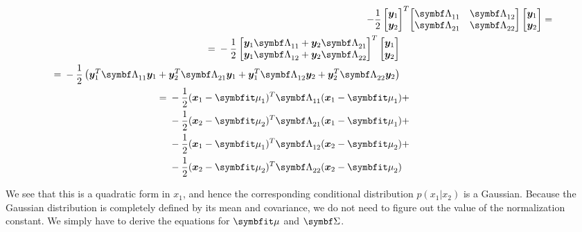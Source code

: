 \begin{align}
    -\frac{1}{2} \begin{bmatrix} \vy_1 \\ \vy_2 \end{bmatrix} ^T & \partlambda \begin{bmatrix} \vy_1 \\ \vy_2 \end{bmatrix} = \\
  \begin{split}
    ={}& -\frac{1}{2} \begin{bmatrix} \vy_1 \ml{11} + \vy_2 \ml{21} \\ \vy_1 \ml{12} + \vy_2 \ml{22} \end{bmatrix} ^T \begin{bmatrix} \vy_1 \\ \vy_2 \end{bmatrix}
  \end{split} \\
  \begin{split}
    ={}& -\frac{1}{2} \left( \vy_1^T \ml{11} \vy_1 + \vy_2^T \ml{21} \vy_1 + \vy_1^T \ml{12} \vy_2 + \vy_2^T \ml{22} \vy_2 \right)
  \end{split} \\
  \begin{split}
    ={}& -\frac{1}{2} (\vx_1 - \vmu_1)^T \ml{11} (\vx_1 - \vmu_1) {}+ \\
       &-\frac{1}{2} (\vx_2 - \vmu_2)^T \ml{21} (\vx_1 - \vmu_1) {}+ \\
       &-\frac{1}{2} (\vx_1 - \vmu_1)^T \ml{12} (\vx_2 - \vmu_2) {}+ \\
       &-\frac{1}{2} (\vx_2 - \vmu_2)^T \ml{22} (\vx_2 - \vmu_2) \label{eq:mvn-quadratic-form}
  \end{split}
\end{align}

We see that this is a quadratic form in $x_1$, and hence the corresponding
conditional distribution $p(x_1 | x_2)$ is a Gaussian. 
Because the Gaussian distribution is completely defined by its mean and
covariance, we do not need to figure out the value of the normalization
constant. We simply have to derive the equations for $\vmu$ and $\mSigma$.


